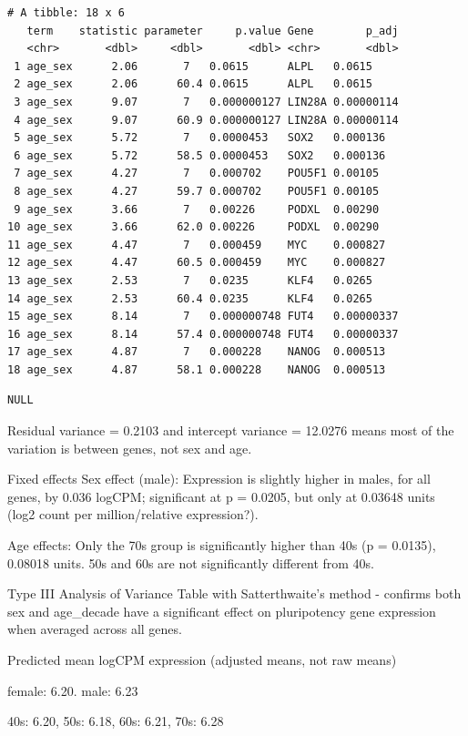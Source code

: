 \documentclass[
  letterpaper,
  DIV=11,
  numbers=noendperiod]{scrartcl}
\begin{document}
\begin{verbatim}
# A tibble: 18 x 6
   term    statistic parameter     p.value Gene        p_adj
   <chr>       <dbl>     <dbl>       <dbl> <chr>       <dbl>
 1 age_sex      2.06       7   0.0615      ALPL   0.0615    
 2 age_sex      2.06      60.4 0.0615      ALPL   0.0615    
 3 age_sex      9.07       7   0.000000127 LIN28A 0.00000114
 4 age_sex      9.07      60.9 0.000000127 LIN28A 0.00000114
 5 age_sex      5.72       7   0.0000453   SOX2   0.000136  
 6 age_sex      5.72      58.5 0.0000453   SOX2   0.000136  
 7 age_sex      4.27       7   0.000702    POU5F1 0.00105   
 8 age_sex      4.27      59.7 0.000702    POU5F1 0.00105   
 9 age_sex      3.66       7   0.00226     PODXL  0.00290   
10 age_sex      3.66      62.0 0.00226     PODXL  0.00290   
11 age_sex      4.47       7   0.000459    MYC    0.000827  
12 age_sex      4.47      60.5 0.000459    MYC    0.000827  
13 age_sex      2.53       7   0.0235      KLF4   0.0265    
14 age_sex      2.53      60.4 0.0235      KLF4   0.0265    
15 age_sex      8.14       7   0.000000748 FUT4   0.00000337
16 age_sex      8.14      57.4 0.000000748 FUT4   0.00000337
17 age_sex      4.87       7   0.000228    NANOG  0.000513  
18 age_sex      4.87      58.1 0.000228    NANOG  0.000513  
\end{verbatim}

\begin{verbatim}
NULL
\end{verbatim}

Residual variance = 0.2103 and intercept variance = 12.0276 means most
of the variation is between genes, not sex and age.

Fixed effects Sex effect (male): Expression is slightly higher in males,
for all genes, by 0.036 logCPM; significant at p = 0.0205, but only at
0.03648 units (log2 count per million/relative expression?).

Age effects: Only the 70s group is significantly higher than 40s (p =
0.0135), 0.08018 units. 50s and 60s are not significantly different from
40s.

Type III Analysis of Variance Table with Satterthwaite's method -
confirms both sex and age\_decade have a significant effect on
pluripotency gene expression when averaged across all genes.

Predicted mean logCPM expression (adjusted means, not raw means)

female: 6.20. male: 6.23

40s: 6.20, 50s: 6.18, 60s: 6.21, 70s: 6.28
\end{document}
